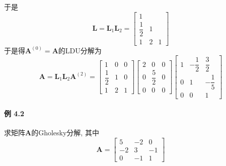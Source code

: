 \documentclass[12pt, a4paper, oneside, fontset=none]{ctexart}
\begin{document}
于是
\[
    \bm{L} = \bm{L}_1\bm{L}_2 = \begin{bmatrix}
        1            &   &   \\
        \dfrac{1}{2} & 1 &   \\
        1            & 2 & 1
    \end{bmatrix}
\]
于是得$\bm{A}^{(0)} = \bm{A}$的LDU分解为
\[
    \bm{A} = \bm{L}_1\bm{L}_2\bm{A}^{(2)} = \begin{bmatrix}
        1            & 0 & 0 \\
        \dfrac{1}{2} & 1 & 0 \\
        1            & 2 & 1
    \end{bmatrix}\begin{bmatrix}
        2 & 0            & 0 \\
        0 & \dfrac{5}{2} & 0 \\
        0 & 0            & 0
    \end{bmatrix}\begin{bmatrix}
        1 & -\dfrac{1}{2} & \dfrac{3}{2}  \\
        0 & 1             & -\dfrac{1}{5} \\
        0 & 0             & 1
    \end{bmatrix}
\]

\paragraph*{例 4.2} 求矩阵$\bm{A}$的Gholesky分解, 其中
\[
    \bm{A} = \begin{bmatrix}
        5  & -2 & 0  \\
        -2 & 3  & -1 \\
        0  & -1 & 1
    \end{bmatrix}
\]
\end{document}
